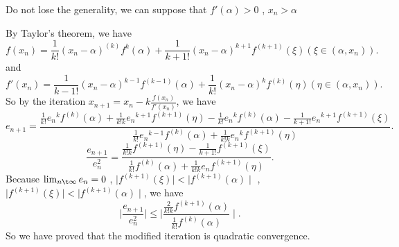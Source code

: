 \documentclass[twoside,a4paper]{article}
\begin{document}
Do not lose the generality, we can suppose that $f'\left( \alpha \right)>0 $
, $x_{n}>\alpha$

By Taylor's theorem, we have 
\[
	f\left( x_{n}\right)=\frac{1}{k!}
	\left( x_{n}-\alpha \right)^{\left( k \right) }f^{k}\left( \alpha \right)
	+\frac{1}{k+1!}
	\left( x_{n}-\alpha \right)^{k+1}f^{\left( k+1 \right) }\left(  \xi\right)  
	\left( \xi\in\left( \alpha, x_{n} \right)  \right) 
.\] 
and
\[
	f'\left( x_{n} \right)=\frac{1}{k-1!}
	\left(  x_{n}-\alpha\right)^{k-1}f^{\left( k-1 \right) }\left( \alpha \right)
	+\frac{1}{k!}
	\left( x_{n}-\alpha \right)^{k}f^{\left( k \right) }\left( \eta\right)  
	\left( \eta\in\left( \alpha, x_{n} \right)  \right) 

.\] 
So by the iteration $x_{n+1}=x_{n}-k\frac{f\left( x_{n} \right) }{f'\left( x_{n} \right) }$, we have
\[
e_{n+1}=\frac{\frac{1}{k!}{e_{n}}^{k}f^{\left(  k\right) }\left( \alpha \right)
+\frac{1}{k!k}{e_{n}}^{k+1}f^{\left( k+1 \right)}\left( \eta \right) 
-\frac{1}{k!}{e_{n}}^{k}f^{\left(  k\right) }\left( \alpha \right)
-\frac{1}{k+1!}{e_{n}}^{k+1}f^{\left( k+1 \right)}\left( \xi \right) 
}
{\frac{1}{k!}{e_{n}}^{k-1}f^{\left( k \right) }\left( \alpha\right) 
+\frac{1}{k!k}{e_{n}}^{k}f^{\left( k+1 \right)}\left( \eta \right) }
.\] 
\[
\frac{e_{n+1}}{e_{n}^{2}}=\frac
{\frac{1}{k!k}f^{\left( k+1 \right)}\left( \eta \right) 
-\frac{1}{k+1!}f^{\left( k+1 \right)}\left( \xi \right) 
}
{\frac{1}{k!}f^{\left( k \right) }\left( \alpha\right) 
+\frac{1}{k!k}{e_{n}}f^{\left( k+1 \right)}\left( \eta \right) }
.\] 
Because $\lim_{n\t\infty}e_{n}=0$
, $ \mid f^{\left( k+1 \right) }\left(  \xi\right)  \mid 
< \mid f^{\left(  k+1\right) }\left( \alpha \right)  \mid $
, $ \mid f^{\left( k+1 \right) }\left(  \xi\right)  \mid 
< \mid f^{\left(  k+1\right) }\left( \alpha \right)  \mid $, we have
\[
 \mid \frac{e_{n+1}}{e_{n}^2} \mid 
 \le  \mid \frac{\frac{2}{k!k}f^{\left( k+1 \right) }\left(  \alpha\right) }
{\frac{1}{k!}f^{\left( k\right) }\left( \alpha \right) } \mid 
.\] 
So we have proved that the modified iteration is quadratic convergence.
\end{document}
